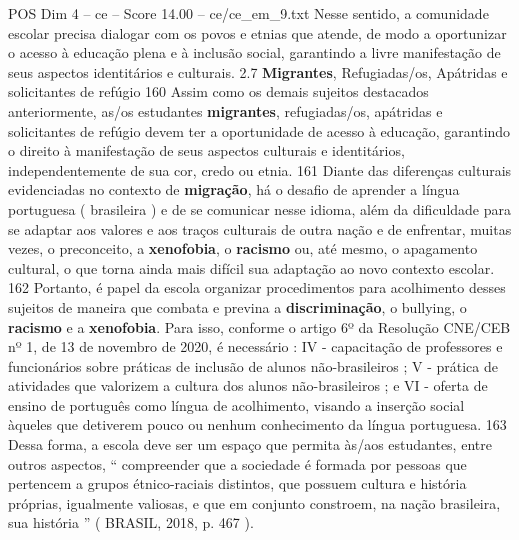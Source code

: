 \begin{textsample}{POS Dim 4 – ce – Score 14.00 – ce/ce\_em\_9.txt}
Nesse sentido, a comunidade escolar precisa dialogar com os povos e etnias que atende, de modo a oportunizar o acesso à educação plena e à inclusão social, garantindo a livre manifestação de seus aspectos identitários e culturais. 2.7 \textbf{Migrantes}, Refugiadas/os, Apátridas e solicitantes de refúgio 160 Assim como os demais sujeitos destacados anteriormente, as/os estudantes \textbf{migrantes}, refugiadas/os, apátridas e solicitantes de refúgio devem ter a oportunidade de acesso à educação, garantindo o direito à manifestação de seus aspectos culturais e identitários, independentemente de sua cor, credo ou etnia. 161 Diante das diferenças culturais evidenciadas no contexto de \textbf{migração}, há o desafio de aprender a língua portuguesa ( brasileira ) e de se comunicar nesse idioma, além da dificuldade para se adaptar aos valores e aos traços culturais de outra nação e de enfrentar, muitas vezes, o preconceito, a \textbf{xenofobia}, o \textbf{racismo} ou, até mesmo, o apagamento cultural, o que torna ainda mais difícil sua adaptação ao novo contexto escolar. 162 Portanto, é papel da escola organizar procedimentos para acolhimento desses sujeitos de maneira que combata e previna a \textbf{discriminação}, o bullying, o \textbf{racismo} e a \textbf{xenofobia}.
Para isso, conforme o artigo 6º da Resolução CNE/CEB nº 1, de 13 de novembro de 2020, é necessário : IV - capacitação de professores e funcionários sobre práticas de inclusão de alunos não-brasileiros ; V - prática de atividades que valorizem a cultura dos alunos não-brasileiros ; e VI - oferta de ensino de português como língua de acolhimento, visando a inserção social àqueles que detiverem pouco ou nenhum conhecimento da língua portuguesa. 163 Dessa forma, a escola deve ser um espaço que permita às/aos estudantes, entre outros aspectos, “ compreender que a sociedade é formada por pessoas que pertencem a grupos étnico-raciais distintos, que possuem cultura e história próprias, igualmente valiosas, e que em conjunto constroem, na nação brasileira, sua história ” ( BRASIL, 2018, p. 467 ).

\end{textsample}
